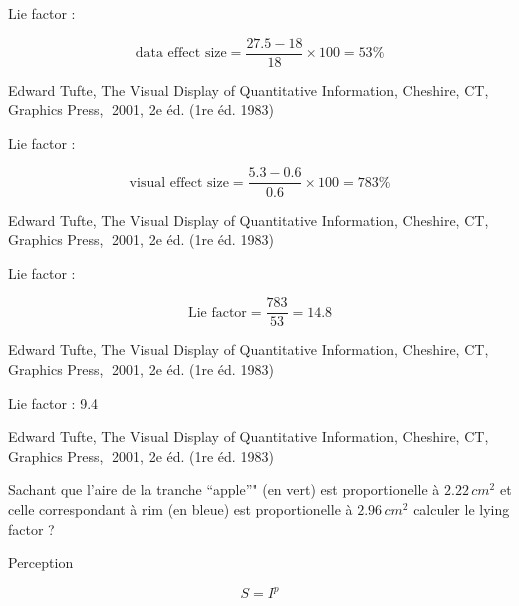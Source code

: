 \documentclass[ignorenonframetext,]{beamer}
\begin{document}
\begin{frame}{}
\protect\hypertarget{section-16}{}

Lie factor :

\[\textrm{data effect size} = \frac{27.5 - 18}{18} \times 100 = 53 \%\]

Edward Tufte, The Visual Display of Quantitative Information, Cheshire,
CT, Graphics Press, 2001, 2e éd. (1re éd. 1983)

\end{frame}

\begin{frame}{}
\protect\hypertarget{section-17}{}

Lie factor :

\[\textrm{visual effect size} = \frac{5.3 -0.6}{0.6} \times 100 = 783 \%\]

Edward Tufte, The Visual Display of Quantitative Information, Cheshire,
CT, Graphics Press, 2001, 2e éd. (1re éd. 1983)

\end{frame}

\begin{frame}{}
\protect\hypertarget{section-18}{}

Lie factor :

\[\textrm{Lie factor} = \frac{783}{53} = 14.8\]

Edward Tufte, The Visual Display of Quantitative Information, Cheshire,
CT, Graphics Press, 2001, 2e éd. (1re éd. 1983)

\end{frame}

\begin{frame}{}
\protect\hypertarget{section-19}{}

Lie factor : 9.4

Edward Tufte, The Visual Display of Quantitative Information, Cheshire,
CT, Graphics Press, 2001, 2e éd. (1re éd. 1983)

\end{frame}

\begin{frame}{}
\protect\hypertarget{section-20}{}

Sachant que l'aire de la tranche ``apple''" (en vert) est proportionelle
à \(2.22\,cm^2\) et celle correspondant à rim (en bleue) est
proportionelle à \(2.96\,cm^2\) calculer le lying factor ?

\end{frame}

\begin{frame}{Perception}
\protect\hypertarget{perception}{}

 \[S = I^p\]

\end{frame}
\end{document}
